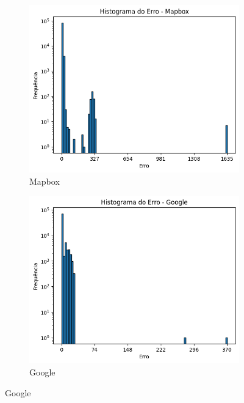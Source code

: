 \begin{figure}[ht]
  \centering
  \begin{subfigure}[b]{0.45\textwidth}
    \includegraphics[width=\textwidth]{Figuras/histMapboxBH.png}
    \caption{Mapbox}
    \label{fig:histmapboxb}
  \end{subfigure}
  \hfill
  \begin{subfigure}[b]{0.45\textwidth}
    \includegraphics[width=\textwidth]{Figuras/histGoogleBH.png}
    \caption{Google}
    \label{fig:histgoogleB}
  \end{subfigure}


\end{figure}
